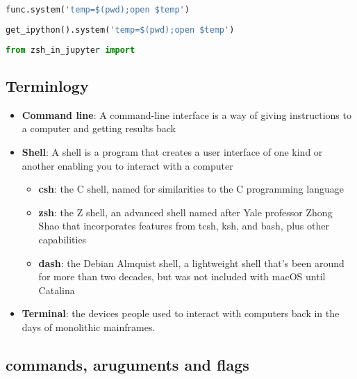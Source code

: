 \documentclass[
]{article}
\providecommand{\tightlist}{%
  \setlength{\itemsep}{0pt}\setlength{\parskip}{0pt}}
\begin{document}
\hypertarget{ca8dc0b8}{}
\begin{lstlisting}[language=Python]
func.system('temp=$(pwd);open $temp')
\end{lstlisting}

\hypertarget{f017b2d9}{}
\begin{lstlisting}[language=Python]
get_ipython().system('temp=$(pwd);open $temp')
\end{lstlisting}

\hypertarget{ce7fec45}{}
\begin{lstlisting}[language=Python]
from zsh_in_jupyter import 
\end{lstlisting}

\hypertarget{d9c1184a}{}
\hypertarget{terminlogy}{%
\subsection{Terminlogy}\label{terminlogy}}

\begin{itemize}
\tightlist
\item
  \textbf{Command line}: A command-line interface is a way of giving
  instructions to a computer and getting results back
\item
  \textbf{Shell}: A shell is a program that creates a user interface of
  one kind or another enabling you to interact with a computer

  \begin{itemize}
  \tightlist
  \item
    \textbf{csh}: the C shell, named for similarities to the C
    programming language
  \item
    \textbf{zsh}: the Z shell, an advanced shell named after Yale
    professor Zhong Shao that incorporates features from tcsh, ksh, and
    bash, plus other capabilities
  \item
    \textbf{dash}: the Debian Almquist shell, a lightweight shell that's
    been around for more than two decades, but was not included with
    macOS until Catalina
  \end{itemize}
\item
  \textbf{Terminal}: the devices people used to interact with computers
  back in the days of monolithic mainframes.
\end{itemize}

\hypertarget{1f3f48b1}{}

\hypertarget{8cde7b83}{}
\hypertarget{commands-aruguments-and-flags}{%
\subsection{commands, aruguments and
flags}\label{commands-aruguments-and-flags}}
\end{document}
